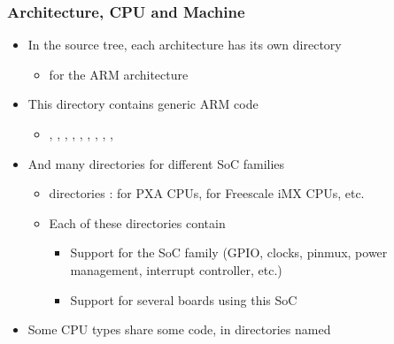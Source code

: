 \begin{frame}
  \frametitle{Architecture, CPU and Machine}
  \begin{itemize}
  \item In the source tree, each architecture has its own directory
    \begin{itemize}
    \item {} for the ARM architecture
    \end{itemize}
  \item This directory contains generic ARM code
    \begin{itemize}
    \item {}, , , ,
      , , , ,
      , 
    \end{itemize}
  \item And many directories for different SoC families
    \begin{itemize}
    \item {} directories :  for PXA CPUs,
       for Freescale iMX CPUs, etc.
    \item Each of these directories contain
      \begin{itemize}
      \item Support for the SoC family (GPIO, clocks, pinmux, power
        management, interrupt controller, etc.)
      \item Support for several boards using this SoC
      \end{itemize}
    \end{itemize}
  \item Some CPU types share some code, in directories named
  \end{itemize}
\end{frame}

